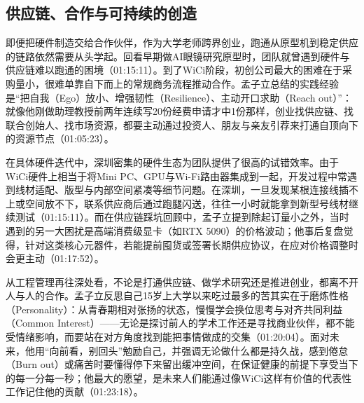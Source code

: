 \documentclass[UTF8,a4paper,11pt,fontset=fandol]{ctexart}
\begin{document}
\subsection{供应链、合作与可持续的创造}
即便把硬件制造交给合作伙伴，作为大学老师跨界创业，跑通从原型机到稳定供应的链路依然需要从头学起。回看早期做AI眼镜研究原型时，团队就曾遇到硬件与供应链难以跑通的困境（01:15:11）。到了WiCi阶段，初创公司最大的困难在于采购量小，很难单靠自下而上的常规商务流程推动合作。孟子立总结的实践经验是“把自我（Ego）放小、增强韧性（Resilience）、主动开口求助（Reach out）”：就像他刚做助理教授前两年连续写20份经费申请才中1份那样，创业找供应链、找联合创始人、找市场资源，都要主动通过投资人、朋友与亲友引荐来打通自顶向下的资源节点（01:05:23）。

在具体硬件迭代中，深圳密集的硬件生态为团队提供了很高的试错效率。由于WiCi硬件上相当于将Mini PC、GPU与Wi-Fi路由器集成到一起，开发过程中常遇到线材适配、版型与内部空间紧凑等细节问题。在深圳，一旦发现某根连接线插不上或空间放不下，联系供应商后通过跑腿闪送，往往一小时就能拿到新型号线材继续测试（01:15:11）。而在供应链踩坑回顾中，孟子立提到除起订量小之外，当时遇到的另一大困扰是高端消费级显卡（如RTX 5090）的价格波动；他事后复盘觉得，针对这类核心元器件，若能提前囤货或签署长期供应协议，在应对价格调整时会更主动（01:17:52）。

从工程管理再往深处看，不论是打通供应链、做学术研究还是推进创业，都离不开人与人的合作。孟子立反思自己15岁上大学以来吃过最多的苦其实在于磨炼性格（Personality）：从青春期相对张扬的状态，慢慢学会换位思考与对齐共同利益（Common Interest）——无论是探讨前人的学术工作还是寻找商业伙伴，都不能受情绪影响，而要站在对方角度找到能把事情做成的交集（01:20:04）。面对未来，他用“向前看，别回头”勉励自己，并强调无论做什么都是持久战，感到倦怠（Burn out）或痛苦时要懂得停下来留出缓冲空间，在保证健康的前提下享受当下的每一分每一秒；他最大的愿望，是未来人们能通过像WiCi这样有价值的代表性工作记住他的贡献（01:23:18）。
\end{document}

